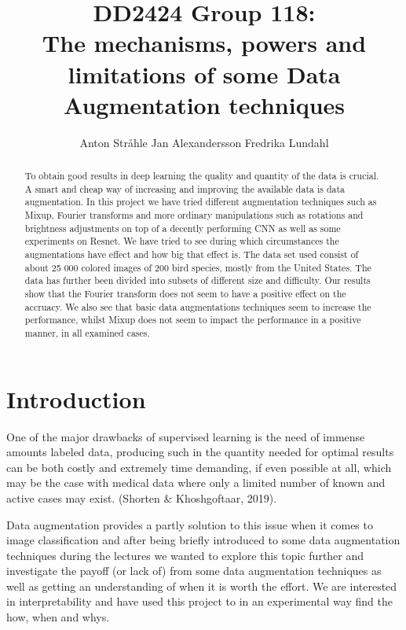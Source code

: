 \documentclass{article}
\title{DD2424 Group 118: \\ The mechanisms, powers and limitations of some Data Augmentation techniques}
\author{%
  Anton Stråhle \And Jan Alexandersson \And Fredrika Lundahl}
\begin{document}
	
\maketitle

\begin{abstract}


To obtain good results in deep learning the quality and quantity of the data is crucial. A smart and cheap way of increasing and 
improving the available data is data augmentation. In this project we have tried different 
augmentation techniques such as Mixup, Fourier transforms and more ordinary manipulations 
such as rotations and brightness adjustments on top of a decently performing CNN as well as some experiments on 
Resnet. We have tried to see during which circumstances the augmentations have effect and how big that 
effect is. The data set used consist of about 25 000 colored images of 200 bird species, mostly from the United States. 
The data has further been divided into subsets of different size and difficulty. Our results show that the 
Fourier transform does not seem to have a positive effect on the accruacy. 
We also see that basic data augmentations techniques seem to increase the performance, whilst Mixup does not 
seem to impact the performance in a positive manner, in all examined cases.


\end{abstract}

\section{Introduction}

% 

One of the major drawbacks of supervised learning is the need of immense amounts labeled data, producing such in the quantity needed for optimal results can be both costly and extremely time demanding, if even possible at all, which may be the case with medical data where only a limited number of known and active cases may exist.  (Shorten \& Khoshgoftaar, 2019). 

Data augmentation provides a partly solution to this issue when it comes to image classification and after being briefly introduced to some data augmentation techniques during the lectures we wanted to explore this topic further and investigate the payoff (or lack of) from some data augmentation techniques as well as getting an understanding of when it is worth the effort. We are interested in interpretability and have used this project to in an experimental way find the how, when and whys. 
\end{document}
